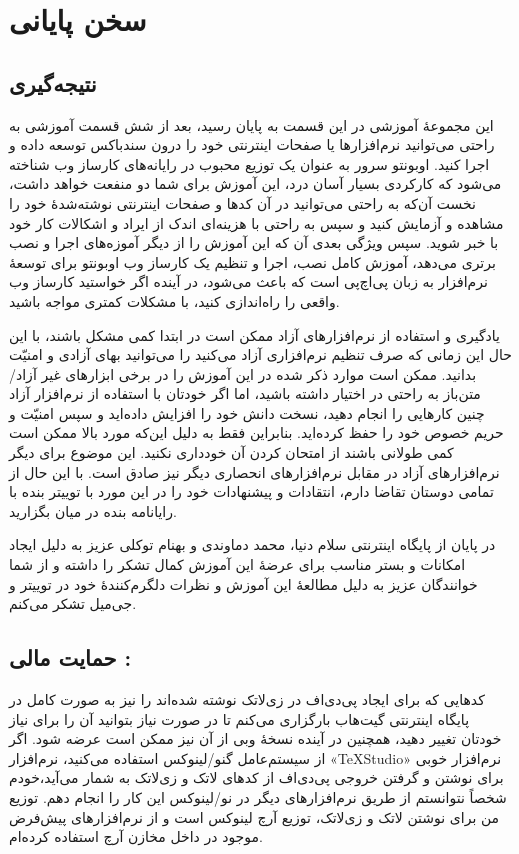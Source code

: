 \part*{سخن پایانی}
\chapter*{نتیجه‌گیری}
این مجموعهٔ آموزشی در این قسمت به پایان رسید، بعد از شش قسمت آموزشی به راحتی می‌توانید نرم‌افزارها یا صفحات اینترنتی خود را درون سندباکس توسعه داده و اجرا کنید. اوبونتو سرور به عنوان یک توزیع محبوب در رایانه‌های کارساز وب شناخته می‌شود که کارکردی بسیار آسان درد، این آموزش برای شما دو منفعت خواهد داشت، نخست آن‌که به راحتی می‌توانید در آن کدها و صفحات اینترنتی نوشته‌شدهٔ خود را مشاهده و آزمایش کنید و سپس به راحتی با هزینه‌ای اندک از ایراد و اشکالات کار خود با خبر شوید. سپس ویژگی بعدی آن که این آموزش را از دیگر آموزه‌های اجرا و نصب 
 برتری می‌دهد، آموزش کامل نصب، اجرا و تنظیم یک کارساز وب اوبونتو برای توسعهٔ نرم‌افزار به زبان پی‌اچ‌پی است که باعث می‌شود، در آینده اگر خواستید کارساز وب واقعی را راه‌اندازی کنید، با مشکلات کمتری مواجه باشید.

یادگیری و استفاده از نرم‌افزارهای آزاد ممکن است در ابتدا کمی مشکل باشند، با این حال این زمانی که صرف تنظیم نرم‌افزاری آزاد می‌کنید را می‌توانید بهای آزادی و امنیّت بدانید. ممکن است موارد ذکر شده در این آموزش را در برخی ابزارهای غیر آزاد/متن‌باز به راحتی در اختیار داشته باشید، اما اگر خودتان با استفاده از نرم‌افزار آزاد چنین کارهایی را انجام دهید، نسخت دانش خود را افزایش داده‌اید و سپس امنیّت و حریم خصوص خود را حفظ کرده‌اید. بنابراین فقط به دلیل این‌که مورد بالا ممکن است کمی طولانی باشند از امتحان کردن آن خودداری نکنید. این موضوع برای دیگر نرم‌افزارهای آزاد در مقابل نرم‌افزارهای انحصاری دیگر نیز صادق است. با این حال از تمامی دوستان تقاضا دارم، انتقادات و پیشنهادات خود را در این مورد با توییتر بنده با رایا‌نامه بنده در میان بگزارید.

در پایان از پایگاه اینترنتی سلام دنیا، محمد دماوندی و بهنام توکلی عزیز به دلیل ایجاد امکانات و بستر مناسب برای عرضهٔ این آموزش کمال تشکر را داشته و از شما خوانندگان عزیز به دلیل مطالعهٔ این آموزش  و نظرات دلگرم‌کنندهٔ خود در توییتر و جی‌میل تشکر می‌کنم.

\chapter*{حمایت مالی :}
کدهایی که برای ایجاد پی‌دی‌اف در زی‌لاتک نوشته شده‌اند را نیز به صورت کامل در پایگاه اینترنتی گیت‌هاب بارگزاری می‌کنم تا در صورت نیاز بتوانید آن را برای نیاز خودتان تغییر دهید، همچنین در آینده نسخهٔ وبی از آن نیز ممکن است عرضه شود. اگر از سیستم‌عامل گنو/لینوکس استفاده می‌کنید، نرم‌افزار «TeXStudio» نرم‌افزار خوبی برای نوشتن و گرفتن خروجی پی‌دی‌اف از کدهای لاتک و زی‌لاتک به شمار می‌آید،خودم شخصاً نتوانستم از طریق نرم‌افزارهای دیگر در نو/لینوکس این کار را انجام دهم. توزیع من برای نوشتن لاتک و زی‌لاتک، توزیع آرچ لینوکس است و از نرم‌افزارهای پیش‌فرض موجود در داخل مخازن آرچ استفاده کرده‌ام.


